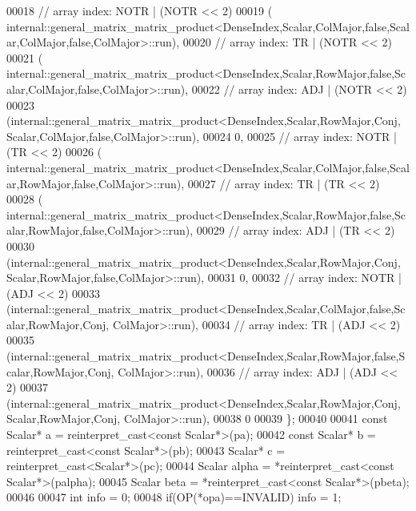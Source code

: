 \begin{DoxyCode}
00018     \textcolor{comment}{// array index: NOTR  | (NOTR << 2)}
00019     (
      internal::general\_matrix\_matrix\_product<DenseIndex,Scalar,ColMajor,false,Scalar,ColMajor,false,ColMajor>::run),
00020     \textcolor{comment}{// array index: TR    | (NOTR << 2)}
00021     (
      internal::general\_matrix\_matrix\_product<DenseIndex,Scalar,RowMajor,false,Scalar,ColMajor,false,ColMajor>::run),
00022     \textcolor{comment}{// array index: ADJ   | (NOTR << 2)}
00023     (internal::general\_matrix\_matrix\_product<DenseIndex,Scalar,RowMajor,Conj,
       Scalar,ColMajor,false,ColMajor>::run),
00024     0,
00025     \textcolor{comment}{// array index: NOTR  | (TR   << 2)}
00026     (
      internal::general\_matrix\_matrix\_product<DenseIndex,Scalar,ColMajor,false,Scalar,RowMajor,false,ColMajor>::run),
00027     \textcolor{comment}{// array index: TR    | (TR   << 2)}
00028     (
      internal::general\_matrix\_matrix\_product<DenseIndex,Scalar,RowMajor,false,Scalar,RowMajor,false,ColMajor>::run),
00029     \textcolor{comment}{// array index: ADJ   | (TR   << 2)}
00030     (internal::general\_matrix\_matrix\_product<DenseIndex,Scalar,RowMajor,Conj,
       Scalar,RowMajor,false,ColMajor>::run),
00031     0,
00032     \textcolor{comment}{// array index: NOTR  | (ADJ  << 2)}
00033     (internal::general\_matrix\_matrix\_product<DenseIndex,Scalar,ColMajor,false,Scalar,RowMajor,Conj,
       ColMajor>::run),
00034     \textcolor{comment}{// array index: TR    | (ADJ  << 2)}
00035     (internal::general\_matrix\_matrix\_product<DenseIndex,Scalar,RowMajor,false,Scalar,RowMajor,Conj,
       ColMajor>::run),
00036     \textcolor{comment}{// array index: ADJ   | (ADJ  << 2)}
00037     (internal::general\_matrix\_matrix\_product<DenseIndex,Scalar,RowMajor,Conj, Scalar,RowMajor,Conj,
       ColMajor>::run),
00038     0
00039   \};
00040 
00041   \textcolor{keyword}{const} Scalar* a = \textcolor{keyword}{reinterpret\_cast<}\textcolor{keyword}{const }Scalar*\textcolor{keyword}{>}(pa);
00042   \textcolor{keyword}{const} Scalar* b = \textcolor{keyword}{reinterpret\_cast<}\textcolor{keyword}{const }Scalar*\textcolor{keyword}{>}(pb);
00043   Scalar* c = \textcolor{keyword}{reinterpret\_cast<}Scalar*\textcolor{keyword}{>}(pc);
00044   Scalar alpha  = *\textcolor{keyword}{reinterpret\_cast<}\textcolor{keyword}{const }Scalar*\textcolor{keyword}{>}(palpha);
00045   Scalar beta   = *\textcolor{keyword}{reinterpret\_cast<}\textcolor{keyword}{const }Scalar*\textcolor{keyword}{>}(pbeta);
00046 
00047   \textcolor{keywordtype}{int} info = 0;
00048   \textcolor{keywordflow}{if}(OP(*opa)==INVALID)                                               info = 1;

\end{DoxyCode}

